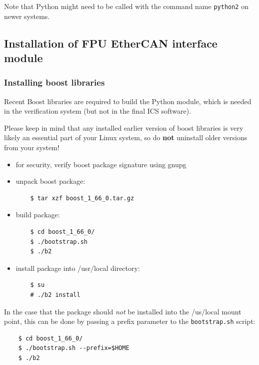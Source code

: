 \documentclass[11pt,a4paper]{scrartcl}
\begin{document}
Note that Python might need to be called with the command name
\texttt{python2} on newer systems.


\subsection{Installation of FPU EtherCAN interface module}
\subsubsection{Installing boost libraries}
Recent Boost libraries are required to build the Python module, which
is needed in the verification system (but not in the final ICS
software).

Please keep in mind that any installed earlier version of boost
libraries is very likely an essential part of your Linux system, so do
\textbf{not} uninstall older versions from your system!

\begin{itemize}
\item for security, verify boost package signature using gnupg

\item unpack boost package:
  
  \begin{verbatim}
    $ tar xzf boost_1_66_0.tar.gz
  \end{verbatim}    

\item build package:

  \begin{verbatim}
    $ cd boost_1_66_0/
    $ ./bootstrap.sh
    $ ./b2
  \end{verbatim}


\item install package into /usr/local directory:

  \begin{verbatim}
    $ su
    # ./b2 install
  \end{verbatim}    
\end{itemize}

In the case that the package  should \emph{not} be installed
into the /us/local mount point, this can be done by passing
a prefix parameter to the \texttt{bootstrap.sh} script:

  \begin{verbatim}
    $ cd boost_1_66_0/
    $ ./bootstrap.sh --prefix=$HOME
    $ ./b2
  \end{verbatim}
\end{document}
